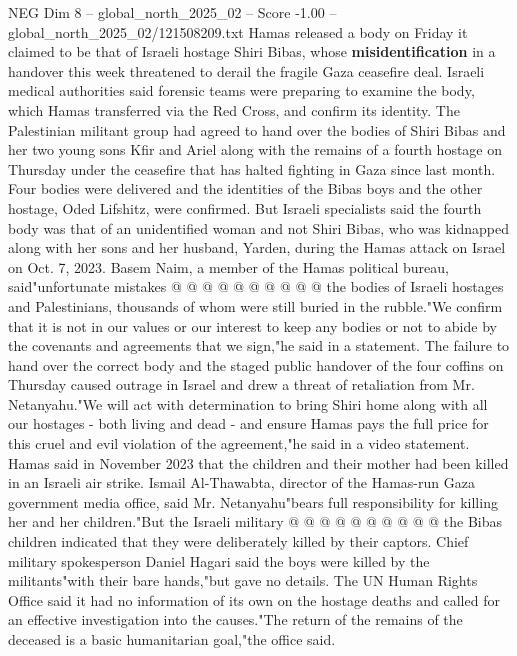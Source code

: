 \begin{textsample}{NEG Dim 8 – global\_north\_2025\_02 – Score -1.00 – global\_north\_2025\_02/121508209.txt}  \label{ex:f8_neg_430}
Hamas released a body on Friday it claimed to be that of Israeli hostage Shiri Bibas, whose \textbf{misidentification} in a handover this week threatened to derail the fragile Gaza ceasefire deal.
Israeli medical authorities said forensic teams were preparing to examine the body, which Hamas transferred via the Red Cross, and confirm its identity.
The Palestinian militant group had agreed to hand over the bodies of Shiri Bibas and her two young sons Kfir and Ariel along with the remains of a fourth hostage on Thursday under the ceasefire that has halted fighting in Gaza since last month.
Four bodies were delivered and the identities of the Bibas boys and the other hostage, Oded Lifshitz, were confirmed.
But Israeli specialists said the fourth body was that of an unidentified woman and not Shiri Bibas, who was kidnapped along with her sons and her husband, Yarden, during the Hamas attack on Israel on Oct. 7, 2023.
Basem Naim, a member of the Hamas political bureau, said"unfortunate mistakes @ @ @ @ @ @ @ @ @ @ the bodies of Israeli hostages and Palestinians, thousands of whom were still buried in the rubble."We confirm that it is not in our values or our interest to keep any bodies or not to abide by the covenants and agreements that we sign,"he said in a statement.
The failure to hand over the correct body and the staged public handover of the four coffins on Thursday caused outrage in Israel and drew a threat of retaliation from Mr.
Netanyahu."We will act with determination to bring Shiri home along with all our hostages - both living and dead - and ensure Hamas pays the full price for this cruel and evil violation of the agreement,"he said in a video statement.
Hamas said in November 2023 that the children and their mother had been killed in an Israeli air strike.
Ismail Al-Thawabta, director of the Hamas-run Gaza government media office, said Mr.
Netanyahu"bears full responsibility for killing her and her children."But the Israeli military @ @ @ @ @ @ @ @ @ @ the Bibas children indicated that they were deliberately killed by their captors.
Chief military spokesperson Daniel Hagari said the boys were killed by the militants"with their bare hands,"but gave no details.
The UN Human Rights Office said it had no information of its own on the hostage deaths and called for an effective investigation into the causes."The return of the remains of the deceased is a basic humanitarian goal,"the office said.

\end{textsample}
